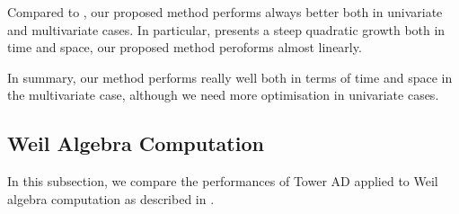 \documentclass[rims-smooth-paper.tex]{subfiles}
\begin{document}
Compared to , our proposed method performs always better both in univariate and multivariate cases.
In particular,  presents a steep quadratic growth both in time and space, our proposed method peroforms almost linearly.

In summary, our method performs really well both in terms of time and space in the multivariate case, although we need more optimisation in univariate cases.

\subsection{Weil Algebra Computation}
In this subsection, we compare the performances of Tower AD applied to Weil algebra computation as described in \cite{Ishii:2021vw}.
\end{document}
